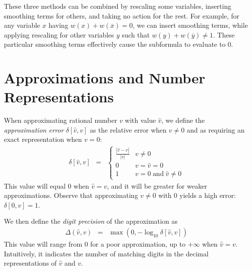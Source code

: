 \documentclass[letterpaper,USenglish,cleveref, autoref, thm-restate]{lipics-v2021}
\newcommand{\obar}[1]{\overline{#1}}
\newcommand{\approximate}[1]{\hat{#1}}
\newcommand{\approxv}{\approximate{v}}
\newcommand{\aerror}{\delta}
\newcommand{\digitprecision}{\Delta}
\begin{document}
  These three methods can be combined by rescaling some variables,
  inserting smoothing terms for others, and taking no action for the rest.
  For example,
  for any variable $x$ having $w(x) + w(\obar{x}) = 0$, we can insert
  smoothing terms, while applying rescaling for other variables $y$ such that $w(y) + w(\obar{y}) \not= 1$.
These particular smoothing terms
  effectively cause the subformula to evaluate to
  $0$.

\section{Approximations and Number Representations}
\label{sect:background:numbers}

When approximating rational number $v$ with value $\approxv$, we
define the \emph{approximation error} $\aerror[\approxv, v]$
as the relative error when $v \not = 0$ and as requiring an exact representation when $v = 0$:
\begin{eqnarray}
\aerror[\approxv, v] & = & \left\{ \begin{array}{ll}
  \frac{|\approxv - v|}{|v|}  & v \not = 0\\
  0 & v  = \approxv = 0\\
  1 & v = 0 \; \textrm{and} \; \approxv \not = 0
  \end{array} \right. \label{eqn:approx:error}
\end{eqnarray}
This value will equal 0 when $\approxv=v$, and it will be greater for weaker approximations.
Observe that approximating $v \not = 0$ with $0$ yields a high error:  $\aerror[0, v] = 1$.

We then define the \emph{digit precision} of the approximation as
\begin{eqnarray}
\digitprecision(\approxv, v) & = & \max(0, -\log_{10} \aerror[\approxv, v]) \label{eqn:digitprecision} 
\end{eqnarray}
This value will range from $0$ for a poor approximation, up to $+\infty$ when $\approxv=v$.
Intuitively, it indicates the number of matching digits in the decimal representations of $\approxv$ and $v$.
\end{document}
